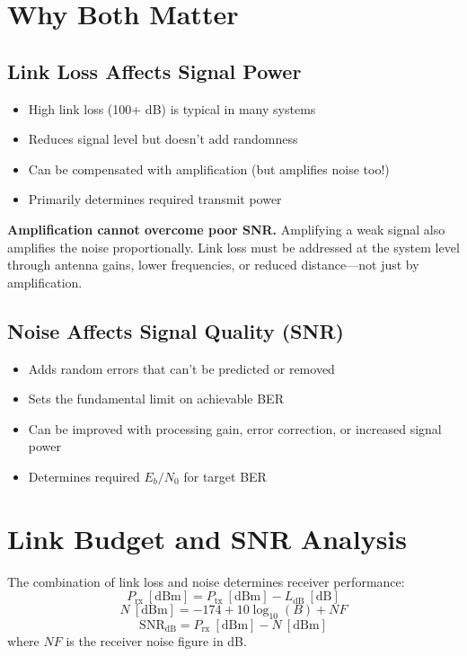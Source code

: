 \section{Why Both Matter}

\subsection{Link Loss Affects Signal Power}

\begin{itemize}
\item High link loss (100+ dB) is typical in many systems
\item Reduces signal level but doesn't add randomness
\item Can be compensated with amplification (but amplifies noise too!)
\item Primarily determines required transmit power
\end{itemize}

\begin{warningbox}
\textbf{Amplification cannot overcome poor SNR.} Amplifying a weak signal also amplifies the noise proportionally. Link loss must be addressed at the system level through antenna gains, lower frequencies, or reduced distance---not just by amplification.
\end{warningbox}

\subsection{Noise Affects Signal Quality (SNR)}

\begin{itemize}
\item Adds random errors that can't be predicted or removed
\item Sets the fundamental limit on achievable BER
\item Can be improved with processing gain, error correction, or increased signal power
\item Determines required $E_b/N_0$ for target BER
\end{itemize}

\section{Link Budget and SNR Analysis}

The combination of link loss and noise determines receiver performance:
\begin{equation}
P_{\text{rx}}\ [\text{dBm}] = P_{\text{tx}}\ [\text{dBm}] - L_{\text{dB}}\ [\text{dB}]
\end{equation}
\begin{equation}
N\ [\text{dBm}] = -174 + 10\log_{10}(B) + NF
\end{equation}
\begin{equation}
\text{SNR}_{\text{dB}} = P_{\text{rx}}\ [\text{dBm}] - N\ [\text{dBm}]
\end{equation}
where $NF$ is the receiver noise figure in dB.

